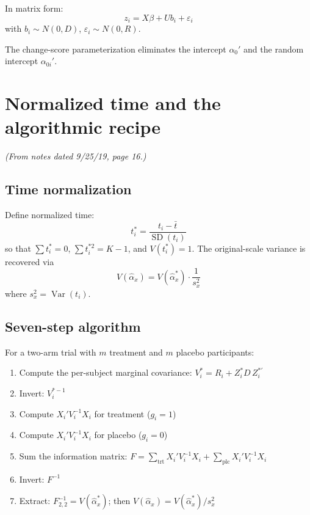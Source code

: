\documentclass[11pt]{article}
\DeclareMathOperator{\Var}{Var}
\DeclareMathOperator{\SD}{SD}
\begin{document}
In matrix form:
\begin{equation}
  z_i = X\beta + U b_i + \varepsilon_i
\end{equation}
with $b_i \sim N(0, D)$,
$\varepsilon_i \sim N(0, R)$.

The change-score parameterization eliminates the intercept
$\alpha_0'$ and the random intercept $\alpha_{0i}'$.


\section{Normalized time and the algorithmic recipe}
\label{sec:algorithm}

\noindent
\textit{(From notes dated 9/25/19, page 16.)}

\subsection{Time normalization}

Define normalized time:
\begin{equation}
  t_i^* = \frac{t_i - \bar{t}}{\SD(t_i)}
\end{equation}
so that $\sum t_i^* = 0$, $\sum t_i^{*2} = K - 1$,
and $V(t_i^*) = 1$. The original-scale variance is
recovered via
\begin{equation}
  V(\hat\alpha_x) = V(\hat\alpha_x^*)
    \cdot \frac{1}{s_x^2}
\end{equation}
where $s_x^2 = \Var(t_i)$.

\subsection{Seven-step algorithm}

For a two-arm trial with $m$ treatment and $m$ placebo
participants:

\begin{enumerate}
  \item Compute the per-subject marginal covariance:
    $V_i^* = R_i + Z_i^* D\, Z_i^{*\prime}$

  \item Invert: $V_i^{*-1}$

  \item Compute $X_i' V_i^{-1} X_i$ for treatment
    ($g_i = 1$)

  \item Compute $X_i' V_i^{-1} X_i$ for placebo
    ($g_i = 0$)

  \item Sum the information matrix:
    $F = \sum_{\text{trt}} X_i' V_i^{-1} X_i
      + \sum_{\text{plc}} X_i' V_i^{-1} X_i$

  \item Invert: $F^{-1}$

  \item Extract: $F_{2,2}^{-1} = V(\hat\alpha_x^*)$;
    then $V(\hat\alpha_x) = V(\hat\alpha_x^*) / s_x^2$
\end{enumerate}
\end{document}

